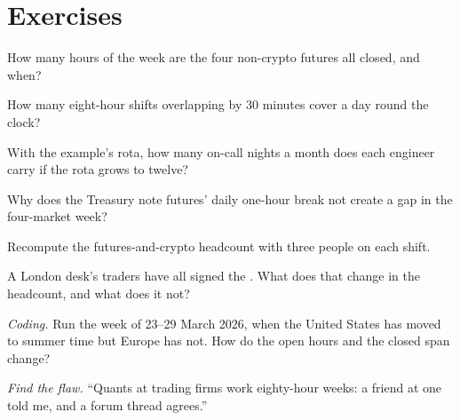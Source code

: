 \section{Exercises}

\begin{exercise}[$\star$]\label{exo:in:hours-rhythm-and-intensity:1}
How many hours of the week are the four non-crypto futures all closed, and when?
\end{exercise}

\begin{exercise}[$\star$]\label{exo:in:hours-rhythm-and-intensity:2}
How many eight-hour shifts overlapping by 30 minutes cover a day round the clock?
\end{exercise}

\begin{exercise}[$\star$]\label{exo:in:hours-rhythm-and-intensity:3}
With the example's rota, how many on-call nights a month does each engineer carry if the rota grows to twelve?
\end{exercise}

\begin{exercise}[$\star\star$]\label{exo:in:hours-rhythm-and-intensity:4}
Why does the Treasury note futures' daily one-hour break not create a gap in the four-market week?
\end{exercise}

\begin{exercise}[$\star\star$]\label{exo:in:hours-rhythm-and-intensity:5}
Recompute the futures-and-crypto headcount with three people on each shift.
\end{exercise}

\begin{exercise}[$\star\star$]\label{exo:in:hours-rhythm-and-intensity:6}
A London desk's traders have all signed the . What does that change in the headcount, and what does it
not?
\end{exercise}

\begin{exercise}[$\star\star\star$]\label{exo:in:hours-rhythm-and-intensity:7}
\emph{Coding.} Run the week of 23--29 March 2026, when the United States has moved to summer time but Europe has not. How
do the open hours and the closed span change?
\end{exercise}

\begin{exercise}[$\star\star\star$]\label{exo:in:hours-rhythm-and-intensity:8}
\emph{Find the flaw.} ``Quants at trading firms work eighty-hour weeks: a friend at one told me, and a forum thread
agrees.''
\end{exercise}

